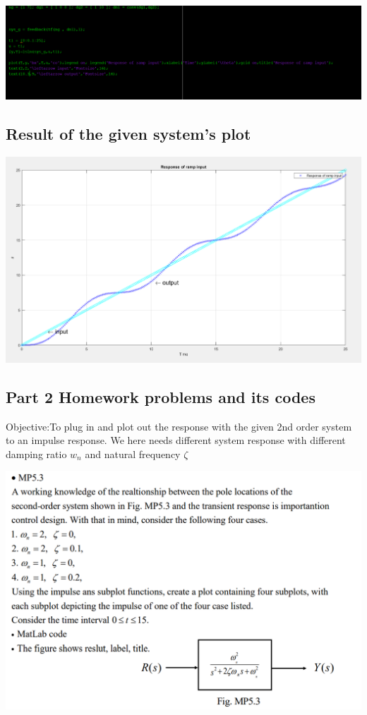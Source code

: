 \documentclass[12pt]{article}
\begin{document}
\includegraphics[scale=0.5]{../Lab9/Pictures/code1.png}  \\ 

\subsection{Result of the given system's plot} 

\includegraphics[scale=0.5]{../Lab9/Pictures/output1.png}  \\ 


\cleardoublepage



 
\cleardoublepage
\subsection{Part 2 Homework problems and its codes}
Objective:To plug in and plot out the response with the given 2nd order system to an impulse response. We here needs different system response with different damping ratio $w_{n}$ and natural frequency $\zeta$

\includegraphics[scale=0.5]{../Lab9/Pictures/hw2.png}  \\
\end{document}
